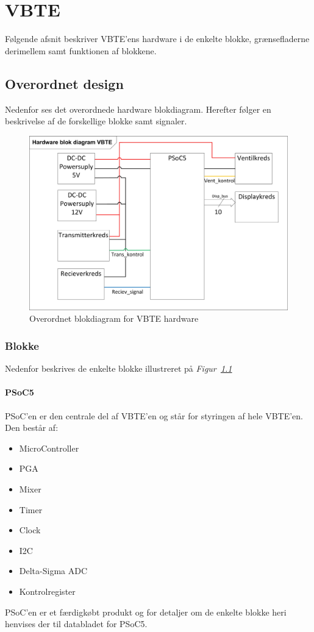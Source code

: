 \chapter{VBTE}
Følgende afsnit beskriver VBTE'ens hardware i de enkelte blokke, grænsefladerne derimellem samt funktionen af blokkene.

\section{Overordnet design}
Nedenfor ses det overordnede hardware blokdiagram. Herefter følger en beskrivelse af de forskellige blokke samt signaler.
\begin{figure}[H]
\centering
\includegraphics[width=.75\textwidth]{billeder/HWVBTE}
\caption{Overordnet blokdiagram for VBTE hardware}
\label{fig:HWVBTE}
\end{figure}
\subsection{Blokke}
Nedenfor beskrives de enkelte blokke illustreret på \textit{Figur~\ref{fig:HWVBTE}}
\subsubsection{PSoC5}
PSoC'en er den centrale del af VBTE'en og står for styringen af hele VBTE'en. Den består af:
\begin{itemize}
\item MicroController
\item PGA
\item Mixer
\item Timer
\item Clock
\item I2C
\item Delta-Sigma ADC
\item Kontrolregister
\end{itemize}
PSoC'en er et færdigkøbt produkt og for detaljer om de enkelte blokke heri henvises der til databladet for PSoC5.
